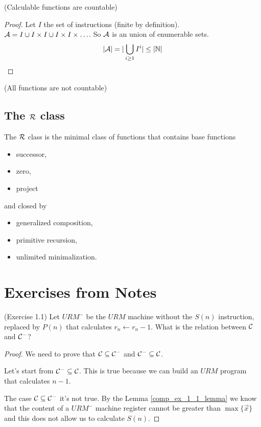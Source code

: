 \documentclass[12pt,a4paper,oneside]{book}
\begin{document}
\begin{lemma}{(Calculable functions are countable)}
    \begin{proof}
        Let $I$ the set of instructions (finite by definition). $\mathcal{A} = I \cup I \times I \cup I \times I \times \ldots$. So $\mathcal{A}$ is an union of enumerable sets.
        \[
          |\mathcal{A}| = | \bigcup_{i \geq 1} I^i | \leq | \mathbb{N} |
        \]
    \end{proof}
\end{lemma}

\begin{lemma}{(All functions are not countable)}
\end{lemma}

\subsection{The  $\mathcal{R}$ class}

The $\mathcal{R}$ class is the minimal class of functions that contains base functions
\begin{itemize}
    \item successor,
    \item zero,
    \item project
\end{itemize}
and closed by 
\begin{itemize}
    \item generalized composition,
    \item primitive recursion,
    \item unlimited minimalization.
\end{itemize}

\section{Exercises from Notes}

\begin{exercise}{(Exercise 1.1)}
    Let $URM^-$ be the $URM$ machine without the $S(n)$ instruction, replaced by $P(n)$ that calculates $r_n \leftarrow r_n - 1$. What is the relation between $\mathcal{C}$ and $\mathcal{C}^-$?
    
    \begin{proof}
        We need to prove that $\mathcal{C} \subseteq \mathcal{C}^-$ and $\mathcal{C}^- \subseteq \mathcal{C}$.
        
        Let's start from $\mathcal{C}^- \subseteq \mathcal{C}$. This is true because we can build an $URM$ program that calculates $n-1$.
        
        The case $\mathcal{C} \subseteq \mathcal{C}^-$ it's not true. By the Lemma \ref{comp_ex_1_1_lemma} we know that the content of a $URM^-$ machine register cannot be greater than $\max \{ \vec{x} \}$ and this does not allow us to calculate $S(n).$
    \end{proof}
\end{exercise}
\end{document}
